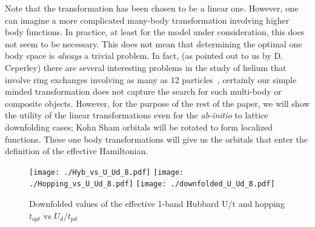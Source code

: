 \documentclass[prl,12pt,onecolumn,nofootinbib,notitlepage,english,superscriptaddress]{revtex4-1}
\begin{document}
Note that the transformation has been chosen to be a linear one. However, 
one can imagine a more complicated many-body transformation involving higher body functions. 
In practice, at least for the model under consideration, this does not seem to be necessary. 
This does not mean that determining the optimal one body space is \emph{always} a trivial problem. 
In fact, (as pointed out to us by D. Ceperley) there are several interesting problems in the study of helium 
that involve ring exchanges involving as many as 12 particles~\cite{Ceperley_Jacucci}, 
certainly our simple minded transformation does not capture the search for such multi-body 
or composite objects. However, for the purpose of the rest of the paper, we will show the utility 
of the linear transformations even for the \emph{ab-initio} to lattice downfolding cases; 
Kohn Sham orbitals will be rotated to form localized functions. These one body transformations will give us the orbitals 
that enter the definition of the effective Hamiltonian. 

\begin{figure}[]
\centering
\texttt{[image: ./Hyb\_vs\_U\_Ud\_8.pdf]}
\texttt{[image: ./Hopping\_vs\_U\_Ud\_8.pdf]}
\texttt{[image: ./downfolded\_U\_Ud\_8.pdf]}
\caption{Downfolded values of the effective 1-band Hubbard U/t and hopping $t_{opt}$ vs $U_d/t_{pd}$}
\label{fig:hamfit} 
\end{figure}	
\end{document}
